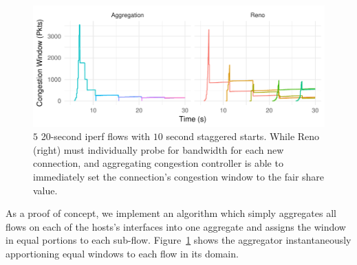 \begin{figure}
    \centering
    \includegraphics[width=\columnwidth]{img/stair}
    \caption{$5$ 20-second iperf flows with $10$ second staggered starts. While Reno (right) must individually probe for bandwidth for each new connection, and aggregating congestion controller is able to immediately set the connection's congestion window to the fair share value.}
    \label{fig:cap:agg}
\end{figure}

As a proof of concept, we implement an algorithm which simply aggregates all flows on each of the hosts's interfaces into one aggregate and assigns the window in equal portions to each sub-flow.
Figure~\ref{fig:cap:agg} shows the aggregator instantaneously apportioning equal windows to each flow in its domain.
 
